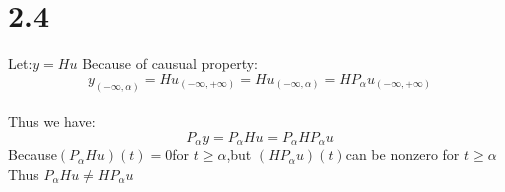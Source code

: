 \documentclass{article}
\begin{document}
\section*{2.4}
Let:$y=Hu$
Because of causual property:
\[y_{(- \infty,\alpha)}=Hu_{(-\infty,+\infty)}=Hu_{(-\infty,\alpha)}=HP_\alpha u_{(-\infty,+\infty)}\]\\
Thus we have:
\[P_\alpha y=P_\alpha Hu=P_\alpha HP_\alpha u\]
Because$(P_\alpha Hu)(t)=0$for $t\geq\alpha$,but $(HP_\alpha u)(t)$can be nonzero for $t \geq\alpha$
Thus $P_\alpha Hu \neq HP_\alpha u$
\end{document}
